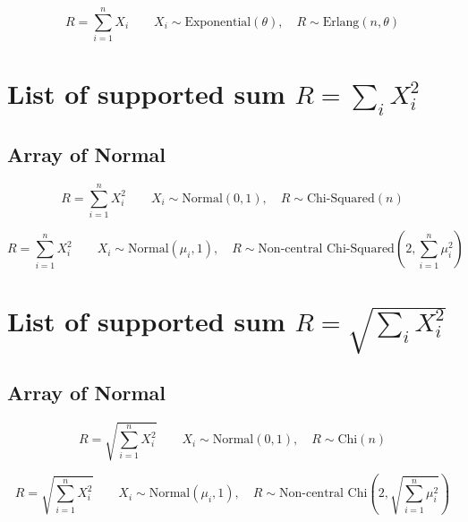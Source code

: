     \begin{equation}
        R = \sum_{i=1}^n X_i \qquad 
        X_i \sim \text{Exponential}(\theta), \quad 
        R \sim \text{Erlang}\left(n, \theta \right)
    \end{equation}


\section{List of supported sum $R = \sum_i X_i^2$}
\subsection{Array of Normal}

\begin{equation}
    R = \sum_{i=1}^n X_i^2 \qquad 
    X_i \sim \text{Normal}(0,1), \quad 
    R \sim \text{Chi-Squared}\left( n \right)
\end{equation}

\begin{equation}
    R = \sum_{i=1}^n X_i^2 \qquad 
    X_i \sim \text{Normal}(\mu_i,1), \quad 
    R \sim \text{Non-central Chi-Squared}\left(2, \sum _{i=1}^{n}\mu _{i}^2\right)
\end{equation}


\section{List of supported sum $R = \sqrt{\sum_i X_i^2}$}
\subsection{Array of Normal}

\begin{equation}
    R = \sqrt{ \sum_{i=1}^n X_i^2 } \qquad 
    X_i \sim \text{Normal}(0,1), \quad 
    R \sim \text{Chi}\left( n \right)
\end{equation}

\begin{equation}
    R = \sqrt{ \sum_{i=1}^n X_i^2 } \qquad 
    X_i \sim \text{Normal}(\mu_i,1), \quad 
    R \sim \text{Non-central Chi} \left( 2, \sqrt{\sum _{i=1}^{n}\mu _{i}^2} \right)
\end{equation}



